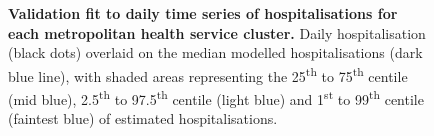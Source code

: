 \begin{figure}[ht]
    \caption{\textbf{Validation fit to daily time series of hospitalisations for each metropolitan health service cluster.} Daily hospitalisation (black dots) overlaid on the median modelled hospitalisations (dark blue line), with shaded areas representing the 25\textsuperscript{th} to 75\textsuperscript{th} centile (mid blue), 2.5\textsuperscript{th} to 97.5\textsuperscript{th} centile (light blue) and 1\textsuperscript{st} to 99\textsuperscript{th} centile (faintest blue) of estimated hospitalisations.}
\end{figure}


